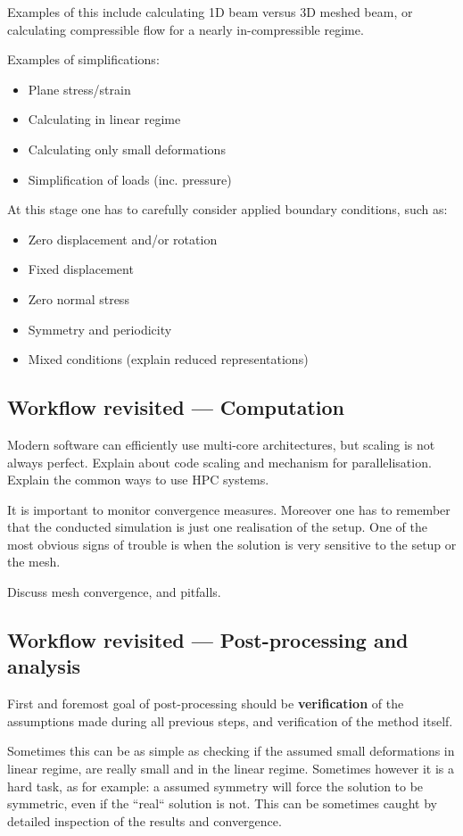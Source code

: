 \documentclass{article}
\begin{document}
Examples of this include calculating 1D beam versus 3D meshed beam, or calculating compressible flow for a nearly in-compressible regime.

Examples of simplifications:
\begin{itemize}
    \item Plane stress/strain
    \item Calculating in linear regime
    \item Calculating only small deformations
    \item Simplification of loads (inc. pressure)
\end{itemize}

At this stage one has to carefully consider applied boundary conditions, such as:
\begin{itemize}
    \item Zero displacement and/or rotation
    \item Fixed displacement
    \item Zero normal stress
    \item Symmetry and periodicity
    \item Mixed conditions (explain reduced representations)
\end{itemize}

\subsection{Workflow revisited --- Computation}
Modern software can efficiently use multi-core architectures, but scaling is not always perfect. Explain about code scaling and mechanism for parallelisation. Explain the common ways to use HPC systems.

It is important to monitor convergence measures. Moreover one has to remember that the conducted simulation is just one realisation of the setup. One of the most obvious signs of trouble is when the solution is very sensitive to the setup or the mesh.

Discuss mesh convergence, and pitfalls.

\subsection{Workflow revisited --- Post-processing and analysis}
First and foremost goal of post-processing should be {\bf verification} of the assumptions made during all previous steps, and verification of the method itself.

Sometimes this can be as simple as checking if the assumed small deformations in linear regime, are really small and in the linear regime. Sometimes however it is a hard task, as for example: a assumed symmetry will force the solution to be symmetric, even if the ``real`` solution is not. This can be sometimes caught by detailed inspection of the results and convergence.
\end{document}
